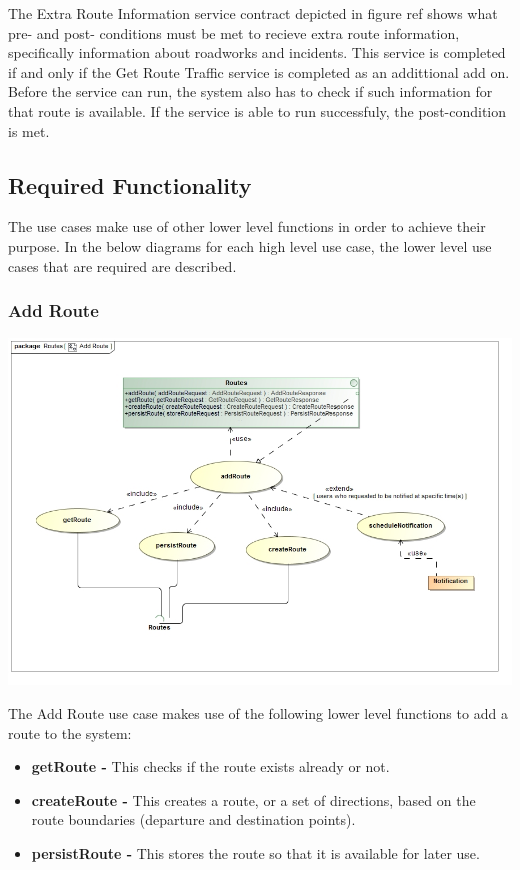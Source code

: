 \documentclass[a4paper,12pt]{article}
\begin{document}
The Extra Route Information service contract depicted in {figure ref} shows what pre- and post- conditions must be met to recieve extra route information, specifically information about roadworks and incidents. This service is completed if and only if the Get Route Traffic service is completed as an addittional add on. Before the service can run, the system also has to check if such information for that route is available. If the service is able to run successfuly, the post-condition is met.

\subsection{Required Functionality}
The use cases make use of other lower level functions in order to achieve their purpose. In the below diagrams for each high level use case, the lower level use cases that are required are described.

\subsubsection{Add Route}
\includegraphics[width=\textwidth]{images/Add_Route.jpg}

The Add Route use case makes use of the following lower level functions to add a route to the system:
\begin{itemize}
\item \textbf{getRoute -} This checks if the route exists already or not.
\item \textbf{createRoute -} This creates a route, or a set of directions, based on the route boundaries (departure and destination points).
\item \textbf{persistRoute -} This stores the route so that it is available for later use.
\end{itemize}
\end{document}
